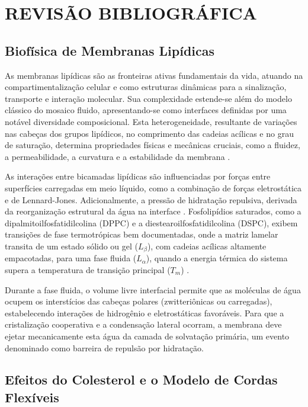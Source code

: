 \section{REVISÃO BIBLIOGRÁFICA}

\subsection{Biofísica de Membranas Lipídicas}

As membranas lipídicas são as fronteiras ativas fundamentais da vida, atuando na compartimentalização celular e como estruturas dinâmicas para a sinalização, transporte e interação molecular. Sua complexidade estende-se além do modelo clássico do mosaico fluido, apresentando-se como interfaces definidas por uma notável diversidade composicional. Esta heterogeneidade, resultante de variações nas cabeças dos grupos lipídicos, no comprimento das cadeias acílicas e no grau de saturação, determina propriedades físicas e mecânicas cruciais, como a fluidez, a permeabilidade, a curvatura e a estabilidade da membrana \cite{watson2015}.

As interações entre bicamadas lipídicas são influenciadas por forças entre superfícies carregadas em meio líquido, como a combinação de forças eletrostática e de Lennard-Jones. Adicionalmente, a pressão de hidratação repulsiva, derivada da reorganização estrutural da água na interface \cite{schneck2012}. Fosfolipídios saturados, como a dipalmitoilfosfatidilcolina (DPPC) e a diestearoilfosfatidilcolina (DSPC), exibem transições de fase termotrópicas bem documentadas, onde a matriz lamelar transita de um estado sólido ou gel ($L_{\beta}$), com cadeias acílicas altamente empacotadas, para uma fase fluida ($L_{\alpha}$), quando a energia térmica do sistema supera a temperatura de transição principal ($T_m$) \cite{sun2018}.

Durante a fase fluida, o volume livre interfacial permite que as moléculas de água ocupem os interstícios das cabeças polares (zwitteriônicas ou carregadas), estabelecendo interações de hidrogênio e eletrostáticas favoráveis. Para que a cristalização cooperativa e a condensação lateral ocorram, a membrana deve ejetar mecanicamente esta água da camada de solvatação primária, um evento denominado como barreira de repulsão por hidratação. \cite{ref_schneck_2012}  


\subsection{Efeitos do Colesterol e o Modelo de Cordas Flexíveis}

